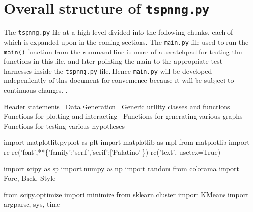 \nwdocspar%
\section{Overall structure of \texttt{tspnng.py}}

The \texttt{tspnng.py} file at a high level divided into the following chunks, 
each of which is expanded upon in the coming sections. The \texttt{main.py} file used to run the \texttt{main()} function
from the command-line is more of a  scratchpad for testing the functions in this file, and later pointing the 
main to the appropriate test harnesses inside the \texttt{tspnng.py} file. Hence \texttt{main.py} will be developed 
independently of this document for convenience because it will be subject to continuous changes. .  

\nwenddocs{}\endmoddef\nwstartdeflinemarkup\nwenddeflinemarkup

\LA{}Header statements~{\nwtagstyle{}}\RA{}
\LA{}Data Generation~{\nwtagstyle{}}\RA{}
\LA{}Generic utility classes and functions~{\nwtagstyle{}}\RA{}
\LA{}Functions for plotting and interacting~{\nwtagstyle{}}\RA{}
\LA{}Functions for generating various graphs~{\nwtagstyle{}}\RA{}
\LA{}Functions for testing various hypotheses~{\nwtagstyle{}}\RA{}

\nwendcode{}\nwdocspar


\nwenddocs{}\endmoddef\nwstartdeflinemarkup{}\nwenddeflinemarkup
import matplotlib.pyplot as plt
import matplotlib as mpl
from matplotlib import rc
rc('font',**\{'family':'serif','serif':['Palatino']\})
rc('text', usetex=True)

import scipy as sp
import numpy as np
import random
from colorama import Fore, Back, Style

from scipy.optimize import minimize
from sklearn.cluster import KMeans
import argparse, sys, time

